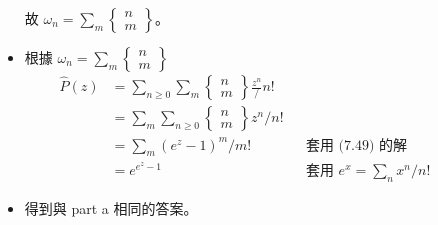 \documentclass[11pt]{article}
\begin{document}
\begin{description}
\begin{itemize}
				故 $\omega_n = \sum_m \begin{Bmatrix}n\\m\end{Bmatrix}$。
			\item 根據 $\omega_n = \sum_m \begin{Bmatrix}n\\m\end{Bmatrix}$
				\begin{align*}
					\widehat{P}(z) &= \sum_{n \ge 0} \sum_m \begin{Bmatrix}n\\m\end{Bmatrix}
						\frac{z^n} / n! \\
					&= \sum_m \sum_{n \ge 0} \begin{Bmatrix}n\\m\end{Bmatrix} z^n / n! \\
					&= \sum_m (e^z-1)^m / m! 
						&& \text{套用 (7.49) 的解}\\
					&= e^{e^z-1}
						&& \text{套用 } e^x = \sum_n x^n / n!
				\end{align*}
			\item 得到與 part a 相同的答案。
		\end{itemize}
\end{description}
\end{document}
